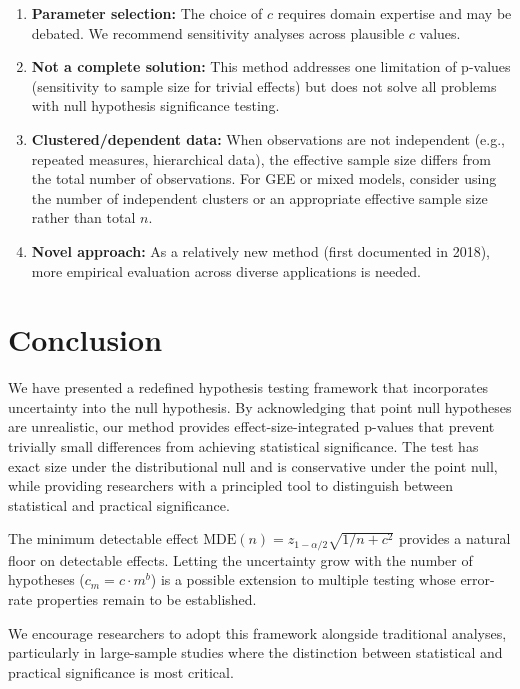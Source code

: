 \documentclass[
  11pt,
  letterpaper,
]{article}
\begin{document}
\begin{enumerate}
\def\labelenumi{\arabic{enumi}.}
\item
  \textbf{Parameter selection:} The choice of \(c\) requires domain
  expertise and may be debated. We recommend sensitivity analyses across
  plausible \(c\) values.
\item
  \textbf{Not a complete solution:} This method addresses one limitation
  of p-values (sensitivity to sample size for trivial effects) but does
  not solve all problems with null hypothesis significance testing.
\item
  \textbf{Clustered/dependent data:} When observations are not
  independent (e.g., repeated measures, hierarchical data), the
  effective sample size differs from the total number of observations.
  For GEE or mixed models, consider using the number of independent
  clusters or an appropriate effective sample size rather than total
  \(n\).
\item
  \textbf{Novel approach:} As a relatively new method (first documented
  in 2018), more empirical evaluation across diverse applications is
  needed.
\end{enumerate}

\section{Conclusion}\label{sec-conclusion}

We have presented a redefined hypothesis testing framework that
incorporates uncertainty into the null hypothesis. By acknowledging that
point null hypotheses are unrealistic, our method provides
effect-size-integrated p-values that prevent trivially small differences
from achieving statistical significance. The test has exact size under
the distributional null and is conservative under the point null, while
providing researchers with a principled tool to distinguish between
statistical and practical significance.

The minimum detectable effect
\(\text{MDE}(n) = z_{1-\alpha/2}\sqrt{1/n + c^2}\) provides a natural
floor on detectable effects. Letting the uncertainty grow with the
number of hypotheses (\(c_m = c \cdot m^b\)) is a possible extension to
multiple testing whose error-rate properties remain to be established.

We encourage researchers to adopt this framework alongside traditional
analyses, particularly in large-sample studies where the distinction
between statistical and practical significance is most critical.
\end{document}
